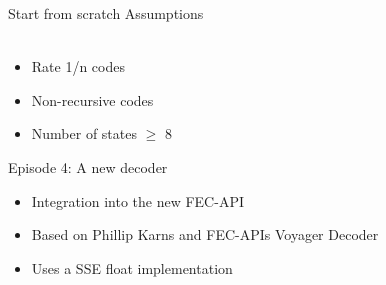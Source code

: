 \documentclass[18pt]{beamer}
\begin{document}
\begin{frame}{Start from scratch}
Assumptions\\~\\
	\begin{itemize}
		\item Rate 1/n codes
		\item Non-recursive codes
		\item Number of states $\geqslant$ 8	
	\end{itemize}
\end{frame}
\begin{frame}{Episode 4: A new decoder}
\begin{itemize}
	\item Integration into the new FEC-API	
	\item Based on Phillip Karns and FEC-APIs Voyager Decoder
	\item Uses a SSE float implementation 
\end{itemize}	
\end{frame}
\end{document}
